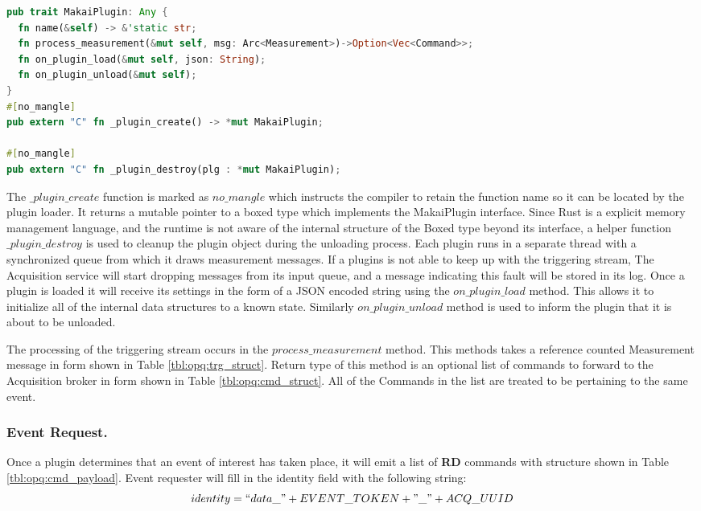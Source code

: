 \begin{lstlisting}[language=Rust, style=colouredRust]
pub trait MakaiPlugin: Any {
  fn name(&self) -> &'static str;
  fn process_measurement(&mut self, msg: Arc<Measurement>)->Option<Vec<Command>>;
  fn on_plugin_load(&mut self, json: String);
  fn on_plugin_unload(&mut self);
}
#[no_mangle]
pub extern "C" fn _plugin_create() -> *mut MakaiPlugin;

#[no_mangle]
pub extern "C" fn _plugin_destroy(plg : *mut MakaiPlugin);
\end{lstlisting}

The $\_plugin\_create$ function is marked as $no\_mangle$ which instructs the compiler to retain the function name so it can be located by the plugin loader.
It returns a mutable pointer to a boxed type which implements the MakaiPlugin interface.
Since Rust is a explicit memory management language, and the runtime is not aware of the internal structure of the Boxed type beyond its interface,
a helper function $\_plugin\_destroy$ is used to cleanup the plugin object during the unloading process.
Each plugin runs in a separate thread with a synchronized queue from which it draws measurement messages.
If a plugins is not able to keep up with the triggering stream, The Acquisition service will start dropping messages from its input queue,
and a message indicating this fault will be stored in its log.
Once a plugin is loaded it will receive its settings in the form of a JSON encoded string using the $on\_plugin\_load$ method.
This allows it to initialize all of the internal data structures to a known state.
Similarly $on\_plugin\_unload$ method is used to inform the plugin that it is about to be unloaded.

The processing of the triggering stream occurs in the $process\_measurement$ method.
This methods takes a reference counted Measurement message in form shown in Table \ref{tbl:opq:trg_struct}.
Return type of this method is an optional list of commands to forward to the Acquisition broker in form shown in Table \ref{tbl:opq:cmd_struct}.
All of the Commands in the list are treated to be pertaining to the same event.

\subsubsection{Event Request.}
Once a plugin determines that an event of interest has taken place, it will emit a list of \textbf{RD} commands with structure shown in Table \ref{tbl:opq:cmd_payload}.
Event requester will fill in the identity field with the following string:
\[ identity = ``data\_" + EVENT\_TOKEN +"\_" + ACQ\_UUID\]

